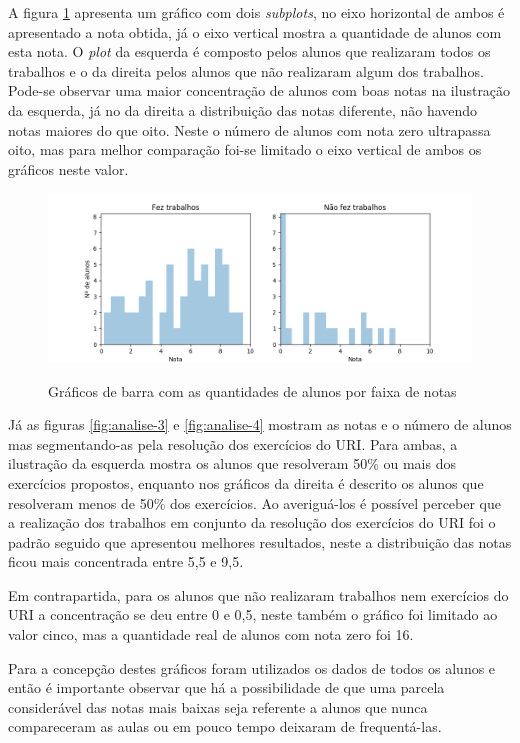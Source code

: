 A figura \ref{fig:analise-2} apresenta um gráfico com dois \textit{subplots}, no eixo horizontal de ambos é apresentado a nota obtida, já o eixo vertical mostra a quantidade de alunos com esta nota.
O \textit{plot} da esquerda é composto pelos alunos que realizaram todos os trabalhos e o da direita pelos alunos que não realizaram algum dos trabalhos. 
Pode-se observar uma maior concentração de alunos com boas notas na ilustração da esquerda, já no da direita a distribuição das notas diferente, não havendo notas maiores do que oito. 
Neste o número de alunos com nota zero ultrapassa oito, mas para melhor comparação foi-se limitado o eixo vertical de ambos os gráficos neste valor.

\begin{figure}[!htb]
    \centering
    \caption{Gráficos de barra com as quantidades de alunos por faixa de notas}
    \includegraphics[width=1\textwidth]{./dados/figuras/analise/grafico2}
    \label{fig:analise-2}
\end{figure}

Já as figuras \ref{fig:analise-3} e \ref{fig:analise-4} mostram as notas e o número de alunos mas segmentando-as pela resolução dos exercícios do URI. 
Para ambas, a ilustração da esquerda mostra os alunos que resolveram 50\% ou mais dos exercícios propostos, enquanto nos gráficos da direita é descrito os alunos que resolveram menos de 50\% dos exercícios.
Ao averiguá-los é possível perceber que a realização dos trabalhos em conjunto da resolução dos exercícios do URI foi o padrão seguido que apresentou melhores resultados, neste a distribuição das notas ficou mais concentrada entre 5,5 e 9,5.

Em contrapartida, para os alunos que não realizaram trabalhos nem exercícios do URI a concentração se deu entre 0 e 0,5, neste também o gráfico foi limitado ao valor cinco, mas a quantidade real de alunos com nota zero foi 16.

Para a concepção destes gráficos foram utilizados os dados de todos os alunos e então é importante observar que há a possibilidade de que uma parcela considerável das notas mais baixas seja referente a alunos que nunca compareceram as aulas ou em pouco tempo deixaram de frequentá-las.

